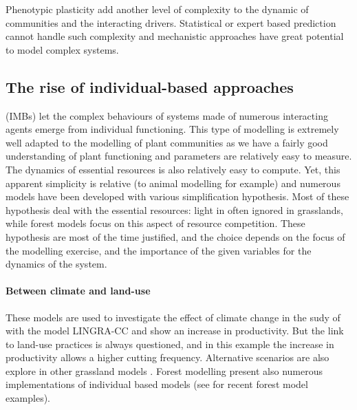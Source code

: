 Phenotypic plasticity add another level of complexity to the dynamic of communities and the interacting drivers. Statistical or expert based prediction cannot handle such complexity and mechanistic approaches have great potential to model complex systems.




\subsection{The rise of individual-based approaches}


 (IMBs) let the complex behaviours of systems made of numerous interacting agents emerge from individual functioning. This type of modelling is extremely well adapted to the modelling of plant communities as we have a fairly good understanding of plant functioning and parameters are relatively easy to measure. The dynamics of essential resources is also relatively easy to compute. Yet, this apparent simplicity is relative (to animal modelling for example) and numerous models have been developed with various simplification hypothesis. Most of these hypothesis deal with the essential resources: light in often ignored in grasslands, while forest models focus on this aspect of resource competition. These hypothesis are most of the time justified, and the choice depends on the focus of the modelling exercise, and the importance of the given variables for the dynamics of the system.

\paragraph{Between climate and land-use}
These models are used to investigate the effect of climate change in the sudy of \cite{rodriguez_lingra-cc:_1999} with the model LINGRA-CC and show an increase in productivity. But the link to land-use practices is always questioned, and in this example the increase in productivity allows a higher cutting frequency. Alternative scenarios are also explore in other grassland models \cite{taubert_review_2012, taubert_modelling_2014, maire_plasticity_2013, maire_trade-off_2009}. Forest modelling present also numerous implementations of individual based models (see \cite{ falster_plant:_2016, marechaux_individual-based_2017} for recent forest model examples).

